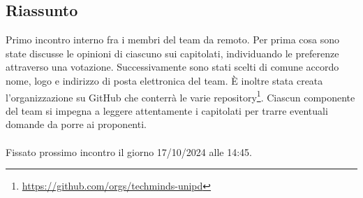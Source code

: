 \documentclass[10pt]{article}
\begin{document}
\subsection{Riassunto}
Primo incontro interno fra i membri del team da remoto. Per prima cosa sono state discusse le opinioni di ciascuno sui capitolati, individuando le preferenze attraverso una votazione.
Successivamente sono stati scelti di comune accordo nome, logo e indirizzo di posta elettronica del team.
È inoltre stata creata l'organizzazione su GitHub che conterrà le varie repository\footnote{\url{https://github.com/orgs/techminds-unipd}}.
Ciascun componente del team si impegna a leggere attentamente i capitolati per trarre eventuali domande da porre ai proponenti. \\\\
Fissato prossimo incontro il giorno 17/10/2024 alle 14:45.
\end{document}
